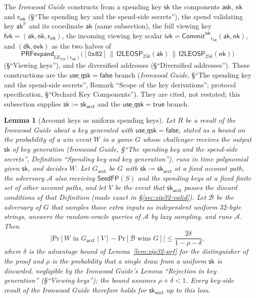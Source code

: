\documentclass[11pt,a4paper]{article}
\newtheorem{lemma}[theorem]{Lemma}
\theoremstyle{definition}
\newcommand{\PP}{\mathbb{P}}
\renewcommand{\Pr}{\mathrm{Pr}}
\newcommand{\Adv}{\mathcal{A}}
\newcommand{\CommitIvk}{\ensuremath{\mathsf{Commit}^{\mathsf{ivk}}}}
\newcommand{\ask}{\ensuremath{\mathsf{ask}}}
\newcommand{\aksym}{\ensuremath{\mathsf{ak}}}
\newcommand{\nksym}{\ensuremath{\mathsf{nk}}}
\newcommand{\ivk}{\ensuremath{\mathsf{ivk}}}
\newcommand{\fvk}{\ensuremath{\mathsf{fvk}}}
\newcommand{\ovk}{\ensuremath{\mathsf{ovk}}}
\newcommand{\dk}{\ensuremath{\mathsf{dk}}}
\newcommand{\rivk}{\ensuremath{\mathsf{r_{ivk}}}}
\begin{document}
The \emph{Ironwood Guide} constructs from a spending key $\mathsf{sk}$ the
components $\ask$, $\nksym$ and $\rivk$ (\S``The spending key and the
spend-side secrets''), the spend validating key $\aksym^{\PP}$ and its
coordinate $\aksym$ (same subsection), the full viewing key
$\fvk = (\aksym, \nksym, \rivk)$, the incoming viewing key scalar
$\ivk = \CommitIvk_{\rivk}(\aksym, \nksym)$, and $(\dk, \ovk)$ as the two
halves of
\[
  \mathsf{PRFexpand}_{\mathrm{LE}_{256}(\rivk)}\bigl([\mathtt{0x82}] \,\|\,
    \mathsf{I2LEOSP}_{256}(\aksym) \,\|\, \mathsf{I2LEOSP}_{256}(\nksym)
  \bigr)
\]
(\S``Viewing keys''), and the diversified addresses (\S``Diversified
addresses''). These constructions are the $\mathsf{use\_qsk} =
\mathsf{false}$ branch (\emph{Ironwood Guide}, \S``The spending key and the
spend-side secrets'', Remark ``Scope of the key derivations''; protocol
specification, \S``Orchard Key Components''). They are cited, not restated; this
subsection supplies $\mathsf{sk} := \mathsf{sk}_{\mathsf{acct}}$ and the
$\mathsf{use\_qsk} = \mathsf{true}$ branch.

\begin{lemma}[Account keys as uniform spending keys]\label{lem:zip32-uniform}
Let $R$ be a result of the \emph{Ironwood Guide} about a key generated with
$\mathsf{use\_qsk} = \mathsf{false}$, stated as a bound on the probability
of a win event $W$ in a game $G$ whose challenger receives the output
$\mathsf{sk}$ of key generation (\emph{Ironwood Guide}, \S``The spending key and
the spend-side secrets'', Definition ``Spending key and key generation''), runs
in time polynomial given $\mathsf{sk}$, and decides $W$. Let $G_{\mathsf{acct}}$
be $G$ with $\mathsf{sk} := \mathsf{sk}_{\mathsf{acct}}$ at a fixed account
path, the adversary $\Adv$ also receiving $\mathsf{SeedFP}(S)$ and the spending
keys at a fixed finite set of other account paths, and let $V$ be the event that
$\mathsf{sk}_{\mathsf{acct}}$ passes the discard conditions of that Definition
(made exact in \S\ref{sec:zip32-valid}). Let $\mathcal{B}$ be the adversary of
$G$ that samples those extra inputs as independent uniform $32$-byte strings,
answers the random-oracle queries of $\Adv$ by lazy sampling, and runs $\Adv$.
Then
\[
  \bigl|\Pr[W \text{ in } G_{\mathsf{acct}} \mid V] -
    \Pr[\mathcal{B} \text{ wins } G]\bigr|
  \le \frac{2\delta}{1 - \rho - \delta},
\]
where $\delta$ is the advantage bound of Lemma~\ref{lem:zip32-prf} for the
distinguisher of the proof and $\rho$ is the probability that a single draw
from a uniform $\mathsf{sk}$ is discarded, negligible by the \emph{Ironwood
Guide}'s Lemma ``Rejection in key generation'' (\S``Viewing keys''); the bound
assumes
$\rho + \delta < 1$. Every key-side result of the \emph{Ironwood Guide}
therefore holds for $\mathsf{sk}_{\mathsf{acct}}$ up to this loss.
\end{lemma}
\end{document}
